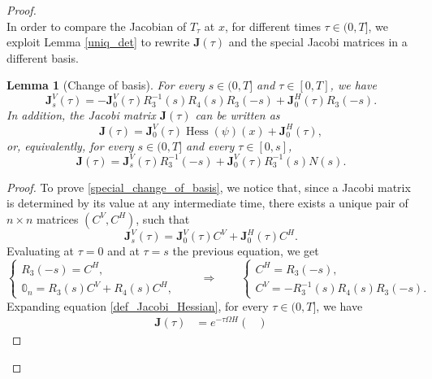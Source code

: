\documentclass[reqno]{amsart}
\DeclareMathOperator{\Hess}{Hess}
\theoremstyle{plain}
\newtheorem{lem}[thm]{Lemma}
\theoremstyle{definition}
\theoremstyle{remark}
\begin{document}
\begin{proof}
\begin{equation}
		\end{equation}
		In order to compare the Jacobian of $T_\tau$ at $x$, for different times $\tau\in(0,T]$, we exploit Lemma \ref{uniq_det} to rewrite $\mathbf{J}(\tau)$ and the special Jacobi matrices in a different basis. 
		\begin{lem}[Change of basis]\label{change_of_basis}
			For every $s\in(0,T]$ and $\tau\in[0,T]$, we have
			\begin{equation}\label{special_change_of_basis}
				\mathbf{J}^V_s(\tau)=-\mathbf{J}^V_0(\tau)R_3^{-1}(s)R_4(s)R_3(-s)+\mathbf{J}^H_0(\tau)R_3(-s).
			\end{equation}
			In addition, the Jacobi matrix $\mathbf{J}(\tau)$ can be written as
			\begin{equation}\label{change_of_basis_Hessian}
				\mathbf{J}(\tau)=\mathbf{J}^V_0(\tau)\Hess(\psi)(x)+\mathbf{J}^H_0(\tau),
			\end{equation}
			or, equivalently, for every $s\in(0,T]$ and every $\tau\in[0,s]$, 
			\begin{equation}\label{change_of_basis_Hessian_2}
				\mathbf{J}(\tau)=\mathbf{J}^V_s(\tau)R_3^{-1}(-s)+\mathbf{J}^V_0(\tau)R_3^{-1}(s)N(s).
			\end{equation}
		\end{lem} 
		\begin{proof}
			To prove \eqref{special_change_of_basis}, we notice that, since a Jacobi matrix is determined by its value at any intermediate time, there exists a unique pair of $n\times n$ matrices $(C^V,C^H)$, such that
			\begin{equation}
				\mathbf{J}^V_s(\tau)=\mathbf{J}^V_0(\tau)C^V+\mathbf{J}^H_0(\tau)C^H.
			\end{equation}
			Evaluating at $\tau=0$ and at $\tau=s$ the previous equation, we get
            \begin{equation}
              \begin{cases}
					R_3(-s)=C^H,\\
					\mathbb{0}_n=R_3(s)C^V+R_4(s)C^H,
				\end{cases} \qquad \Rightarrow \qquad \begin{cases}
					C^H=R_3(-s),\\
					C^V=-R_3^{-1}(s)R_4(s)R_3(-s).
				\end{cases}
            \end{equation}
			Expanding equation \eqref{def_Jacobi_Hessian}, for every $\tau\in(0,T]$, we have 
			\begin{align}
				\mathbf{J}(\tau)&=e^{-\tau\Omega H}\begin{pmatrix}

\end{pmatrix}
\end{align}
\end{proof}
\end{proof}
\end{document}

